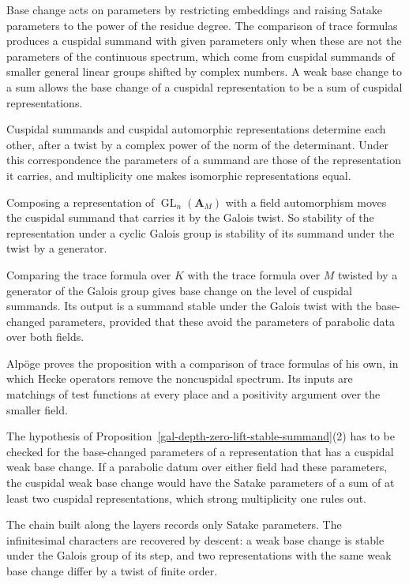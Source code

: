 Base change acts on parameters by restricting embeddings and raising Satake parameters to the power of
the residue degree. The comparison of trace formulas produces a cuspidal summand with given parameters
only when these are not the parameters of the continuous spectrum, which come from cuspidal summands of
smaller general linear groups shifted by complex numbers. A weak base change to a sum allows the base
change of a cuspidal representation to be a sum of cuspidal representations.

Cuspidal summands and cuspidal automorphic representations determine each other, after a twist by a
complex power of the norm of the determinant. Under this correspondence the parameters of a summand are
those of the representation it carries, and multiplicity one makes isomorphic representations equal.

Composing a representation of $\operatorname{GL}_n(\mathbf A_M)$ with a field automorphism moves the
cuspidal summand that carries it by the Galois twist. So stability of the representation under a cyclic
Galois group is stability of its summand under the twist by a generator.

Comparing the trace formula over $K$ with the trace formula over $M$ twisted by a generator of the
Galois group gives base change on the level of cuspidal summands. Its output is a summand stable under
the Galois twist with the base-changed parameters, provided that these avoid the parameters of parabolic
data over both fields.

Alpöge proves the proposition with a comparison of trace formulas of his own, in which Hecke operators
remove the noncuspidal spectrum. Its inputs are matchings of test functions at every place and a
positivity argument over the smaller field.

The hypothesis of Proposition~\ref{gal-depth-zero-lift-stable-summand}(2) has to be checked for the
base-changed parameters of a representation that has a cuspidal weak base change. If a parabolic datum
over either field had these parameters, the cuspidal weak base change would have the Satake parameters
of a sum of at least two cuspidal representations, which strong multiplicity one rules out.

The chain built along the layers records only Satake parameters. The infinitesimal characters are
recovered by descent: a weak base change is stable under the Galois group of its step, and two
representations with the same weak base change differ by a twist of finite order.

